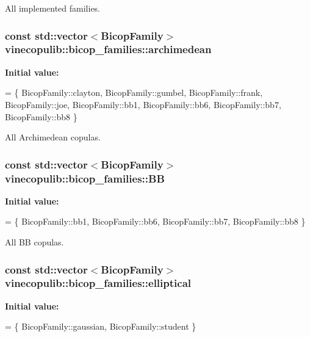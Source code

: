 All implemented families. 

\hypertarget{namespacevinecopulib_1_1bicop__families_a714863b69ae59ac48c7fb2be45cd2619}{
\subsubsection[{archimedean}]{\setlength{\rightskip}{0pt plus 5cm}const std\+::vector$<${\bf Bicop\+Family}$>$ vinecopulib\+::bicop\+\_\+families\+::archimedean}}\label{namespacevinecopulib_1_1bicop__families_a714863b69ae59ac48c7fb2be45cd2619}
{\bfseries Initial value\+:}
\begin{DoxyCode}
= \{
            BicopFamily::clayton, 
            BicopFamily::gumbel, 
            BicopFamily::frank, 
            BicopFamily::joe, 
            BicopFamily::bb1, 
            BicopFamily::bb6, 
            BicopFamily::bb7, 
            BicopFamily::bb8
        \}
\end{DoxyCode}


All Archimedean copulas. 

\hypertarget{namespacevinecopulib_1_1bicop__families_aea9f7383b4bbbe47d4862f25e6bb8ad8}{
\subsubsection[{B\+B}]{\setlength{\rightskip}{0pt plus 5cm}const std\+::vector$<${\bf Bicop\+Family}$>$ vinecopulib\+::bicop\+\_\+families\+::\+B\+B}}\label{namespacevinecopulib_1_1bicop__families_aea9f7383b4bbbe47d4862f25e6bb8ad8}
{\bfseries Initial value\+:}
\begin{DoxyCode}
= \{
            BicopFamily::bb1, 
            BicopFamily::bb6, 
            BicopFamily::bb7, 
            BicopFamily::bb8
        \}
\end{DoxyCode}


All B\+B copulas. 

\hypertarget{namespacevinecopulib_1_1bicop__families_a24b790671c9f4b25e57ecbc3505232fb}{
\subsubsection[{elliptical}]{\setlength{\rightskip}{0pt plus 5cm}const std\+::vector$<${\bf Bicop\+Family}$>$ vinecopulib\+::bicop\+\_\+families\+::elliptical}}\label{namespacevinecopulib_1_1bicop__families_a24b790671c9f4b25e57ecbc3505232fb}
{\bfseries Initial value\+:}
\begin{DoxyCode}
= \{
            BicopFamily::gaussian, 
            BicopFamily::student
        \}
\end{DoxyCode}



